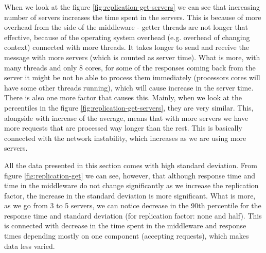 \documentclass[11pt]{article}
\begin{document}

When we look at the figure \ref{fig:replication-get-servers} we can see that increasing number of servers increases the time spent in the servers. This is because of more overhead from the side of the middleware - getter threads are not longer that effective, because of the operating system overhead (e.g. overhead of changing context) connected with more threads. It takes longer to send and receive the message with more servers (which is counted as server time). What is more, with many threads and only 8 cores, for some of the responses coming back from the server it might be not be able to process them immediately (processors cores will have some other threads running), which will cause increase in the server time. There is also one more factor that causes this. Mainly, when we look at the percentiles in the figure \ref{fig:replication-get-servers}, they are very similar. This, alongside with increase of the average, means that with more servers we have more requests that are processed way longer than the rest. This is basically connected with the network instability, which increases as we are using more servers. 

All the data presented in this section comes with high standard deviation. From figure \ref{fig:replication-get} we can see, however, that although response time and time in the middleware do not change significantly as we increase the replication factor, the increase in the standard deviation is more significant. What is more, as we go from 3 to 5 servers, we can notice decrease in the 90th percentile for the response time and standard deviation (for replication factor: none and half). This is connected with decrease in the time spent in the middleware and response times depending mostly on one component (accepting requests), which makes data less varied.
\end{document}
